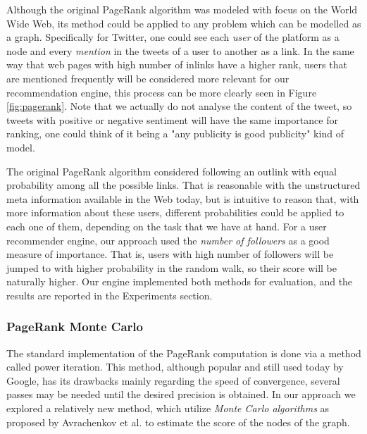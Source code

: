 Although the original PageRank algorithm was modeled with focus on the World
Wide Web, its method could be applied to any problem which can be modelled as a
graph. Specifically for Twitter, one could see each \emph{user} of the platform
as a node and every \emph{mention} in the tweets of a user to another as a link.
In the same way that web pages with high number of inlinks have a higher rank,
users that are mentioned frequently will be considered more relevant for our
recommendation engine, this process can be more clearly seen in Figure
\ref{fig:pagerank}. Note that we actually do not analyse the content of the
tweet, so tweets with positive or negative sentiment will have the same
importance for ranking, one could think of it being a "any publicity is good
publicity" kind of model.

The original PageRank algorithm considered following an outlink with equal
probability among all the possible links. That is reasonable with the
unstructured meta information available in the Web today, but is intuitive to
reason that, with more information about these users, different probabilities
could be applied to each one of them, depending on the task that we have at
hand. For a user recommender engine, our approach used the \emph{number of
followers} as a good measure of importance. That is, users with high number of
followers will be jumped to with higher probability in the random walk, so their
score will be naturally higher. Our engine implemented both methods for
evaluation, and the results are reported in the Experiments section.

\subsubsection{PageRank Monte Carlo}

The standard implementation of the PageRank computation is done via a method called power iteration. This method, although popular and still used today
by Google, has its drawbacks mainly regarding the speed of convergence, several
passes may be needed until the desired precision is obtained. In our approach we
explored a relatively new method, which utilize \emph{Monte Carlo algorithms} as proposed by Avrachenkov et al.
\cite{prmc} to
estimate the score of the nodes of the graph.

